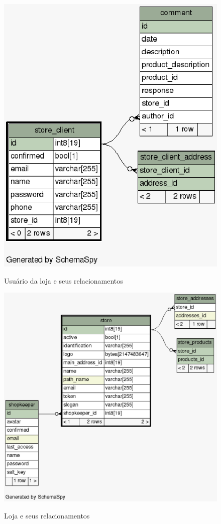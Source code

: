 \documentclass[a4paper,12pt]{monografia}
\begin{document}
\begin{figure}[H]
\centering
\caption{Usuário da loja e seus relacionamentos}
\centering
\includegraphics[scale=0.7]{img/diagramas/schema/store_client.1degree.png.eps}\\
\end{figure}

\begin{figure}[H]
\centering
\caption{Loja e seus relacionamentos}
\centering
\includegraphics[scale=0.7]{img/diagramas/schema/store.1degree.png.eps}\\
\end{figure}
\end{document}
